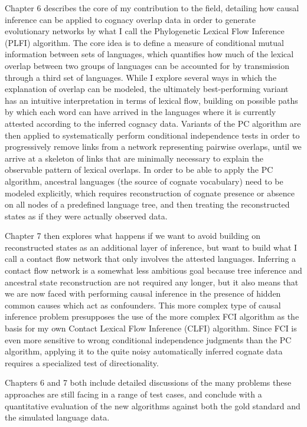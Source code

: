 Chapter 6 describes the core of my contribution to the field, detailing how causal inference can be applied to cognacy overlap data in order to generate evolutionary networks by what I call the Phylogenetic Lexical Flow Inference (PLFI) algorithm. The core idea is to define a measure of conditional mutual information between sets of languages, which quantifies how much of the lexical overlap between two groups of languages can be accounted for by transmission through a third set of languages. While I explore several ways in which the explanation of overlap can be modeled, the ultimately best-performing variant has an intuitive interpretation in terms of lexical flow, building on possible paths by which each word can have arrived in the languages where it is currently attested according to the inferred cognacy data. Variants of the PC algorithm are then applied to systematically perform conditional independence tests in order to progressively remove links from a network representing pairwise overlaps, until we arrive at a skeleton of links that are minimally necessary to explain the observable pattern of lexical overlaps. In order to be able to apply the PC algorithm, ancestral languages (the source of cognate vocabulary) need to be modeled explicitly, which requires reconstruction of cognate presence or absence on all nodes of a predefined language tree, and then treating the reconstructed states as if they were actually observed data.

Chapter 7 then explores what happens if we want to avoid building on reconstructed states as an additional layer of inference, but want to build what I call a contact flow network that only involves the attested languages. Inferring a contact flow network is a somewhat less ambitious goal because tree inference and ancestral state reconstruction are not required any longer, but it also means that we are now faced with performing causal inference in the presence of hidden common causes which act as confounders. This more complex type of causal inference problem presupposes the use of the more complex FCI algorithm as the basis for my own Contact Lexical Flow Inference (CLFI) algorithm. Since FCI is even more sensitive to wrong conditional independence judgments than the PC algorithm, applying it to the quite noisy automatically inferred cognate data requires a specialized test of directionality.

Chapters 6 and 7 both include detailed discussions of the many problems these approaches are still facing in a range of test cases, and conclude with a quantitative evaluation of the new algorithms against both the gold standard and the simulated language data.

